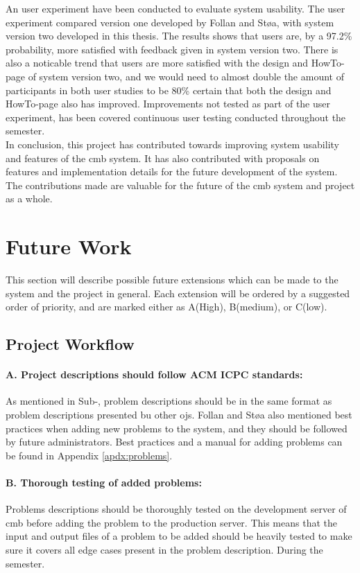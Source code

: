An user experiment have been conducted to evaluate system usability. The user experiment compared version one developed by Follan and Støa, with system version two developed in this thesis. The results shows that users are, by a 97.2\% probability, more satisfied with feedback given in system version two. There is also a noticable trend that users are more satisfied with the design and HowTo-page of system version two, and we would need to almost double the amount of participants in both user studies to be 80\% certain that both the design and HowTo-page also has improved. Improvements not tested as part of the user experiment, has been covered continuous user testing conducted throughout the semester. \\

In conclusion, this project has contributed towards improving system usability and features of the \gls{cmb} system. It has also contributed with proposals on features and implementation details for the future development of the system. The contributions made are valuable for the future of the \gls{cmb} system and project as a whole.


\section{Future Work}
\label{sec:future-work}
This section will describe possible future extensions which can be made to the system and the project in general. Each extension will be ordered by a suggested order of priority, and are marked either as A(High), B(medium), or C(low).

\subsection*{Project Workflow}

\paragraph*{A. Project descriptions should follow ACM ICPC standards:} As mentioned in Sub-, problem descriptions should be in the same format as problem descriptions presented bu other \glspl{oj}. Follan and Støa also mentioned best practices when adding new problems to the system, and they should be followed by future administrators. Best practices and a manual for adding problems can be found in Appendix \ref{apdx:problems}.

\paragraph*{B. Thorough testing of added problems:} Problems descriptions should be thoroughly tested on the development server of \gls{cmb} before adding the problem to the production server. This means that the input and output files of a problem to be added should be heavily tested to make sure it covers all edge cases present in the problem description. During the semester.

